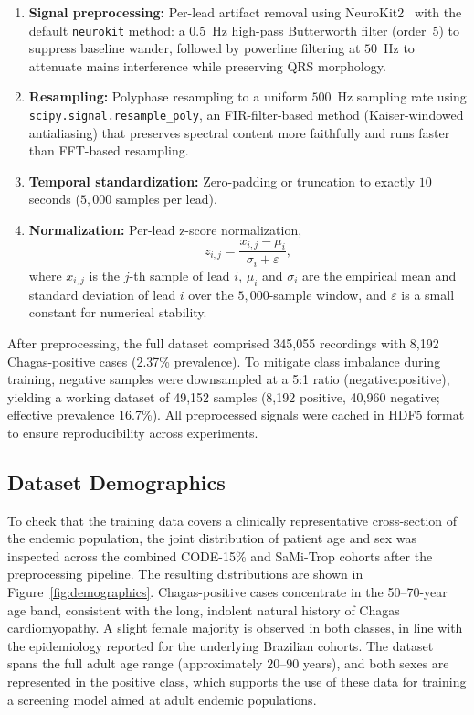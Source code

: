 \begin{enumerate}
    \item \textbf{Signal preprocessing:} Per-lead artifact removal using NeuroKit2~\cite{neurokit2} with the default \texttt{neurokit} method: a $0.5$~Hz high-pass Butterworth filter (order~5) to suppress baseline wander, followed by powerline filtering at $50$~Hz to attenuate mains interference while preserving QRS morphology.
    \item \textbf{Resampling:} Polyphase resampling to a uniform $500$~Hz sampling rate using \newline \texttt{scipy.signal.resample\_poly}, an FIR-filter-based method (Kaiser-windowed antialiasing) that preserves spectral content more faithfully and runs faster than FFT-based resampling.
    \item \textbf{Temporal standardization:} Zero-padding or truncation to exactly $10$ seconds ($5{,}000$ samples per lead).
    \item \textbf{Normalization:} Per-lead z-score normalization,
        \begin{equation}
            z_{i,j} = \frac{x_{i,j} - \mu_i}{\sigma_i + \varepsilon},
        \end{equation}
        where $x_{i,j}$ is the $j$-th sample of lead $i$, $\mu_i$ and $\sigma_i$ are the empirical mean and standard deviation of lead $i$ over the $5{,}000$-sample window, and $\varepsilon$ is a small constant for numerical stability.
\end{enumerate}

After preprocessing, the full dataset comprised 345,055 recordings with 8,192 Chagas-positive cases (2.37\% prevalence). To mitigate class imbalance during training, negative samples were downsampled at a 5:1 ratio (negative:positive), yielding a working dataset of 49,152 samples (8,192 positive, 40,960 negative; effective prevalence 16.7\%). All preprocessed signals were cached in HDF5 format to ensure reproducibility across experiments.

\subsection{Dataset Demographics}
\label{sec:demographics}

To check that the training data covers a clinically representative cross-section of the endemic population, the joint distribution of patient age and sex was inspected across the combined CODE-15\% and SaMi-Trop cohorts after the preprocessing pipeline. The resulting distributions are shown in Figure~\ref{fig:demographics}. Chagas-positive cases concentrate in the 50--70-year age band, consistent with the long, indolent natural history of Chagas cardiomyopathy. A slight female majority is observed in both classes, in line with the epidemiology reported for the underlying Brazilian cohorts. The dataset spans the full adult age range (approximately $20$--$90$ years), and both sexes are represented in the positive class, which supports the use of these data for training a screening model aimed at adult endemic populations.

